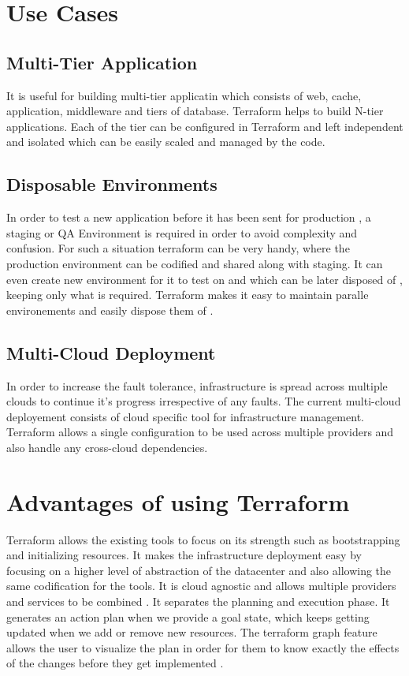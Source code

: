 \documentclass[9pt,twocolumn,twoside]{../../styles/osajnl}
\begin{document}
\section{Use Cases}

\subsection{Multi-Tier Application}

It is useful for building multi-tier applicatin which consists of web,
cache, application, middleware and tiers of database. Terraform helps
to build N-tier applications. Each of the tier can be configured in
Terraform and left independent and isolated which can be easily scaled
and managed by the code\cite{www-terraform-book}.


\subsection{Disposable Environments}

In order to test a new application before it has been sent for
production , a staging or QA Environment is required in order to avoid
complexity and confusion. For such a situation terraform can be very
handy, where the production environment can be codified and shared
along with staging\cite{www-terraform-book}. It can even create new
environment for it to test on and which can be later disposed of ,
keeping only what is required. Terraform makes it easy to maintain
paralle environements and easily dispose them
of \cite{www-terraform-book}.

\subsection{Multi-Cloud Deployment}

In order to increase the fault tolerance, infrastructure is spread
across multiple clouds to continue it's progress irrespective of any
faults. The current multi-cloud deployement consists of cloud specific
tool for infrastructure management. Terraform allows a single
configuration to be used across multiple providers and also handle any
cross-cloud dependencies\cite{www-terraform}.

\section{Advantages of using Terraform}

Terraform allows the existing tools to focus on its strength such as
bootstrapping and initializing resources. It makes the infrastructure
deployment easy by focusing on a higher level of abstraction of the
datacenter and also allowing the same codification for the tools. It
is cloud agnostic and allows multiple providers and services to be
combined \cite{www-terraform-othersoftware}. It separates the planning
and execution phase. It generates an action plan when we provide a
goal state, which keeps getting updated when we add or remove new
resources. The terraform graph feature allows the user to visualize
the plan in order for them to know exactly the effects of the changes
before they get implemented \cite{www-terraform-othersoftware}.
\end{document}
